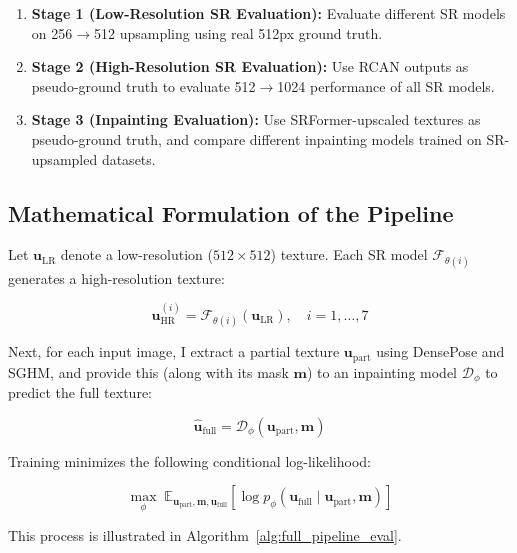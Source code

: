 \begin{enumerate}
    \item \textbf{Stage 1 (Low-Resolution SR Evaluation):} Evaluate different SR models on 256$\rightarrow$512 upsampling using real 512px ground truth.
    \item \textbf{Stage 2 (High-Resolution SR Evaluation):} Use RCAN outputs as pseudo-ground truth to evaluate 512$\rightarrow$1024 performance of all SR models.
    \item \textbf{Stage 3 (Inpainting Evaluation):} Use SRFormer-upscaled textures as pseudo-ground truth, and compare different inpainting models trained on SR-upsampled datasets.
\end{enumerate}

\subsection{Mathematical Formulation of the Pipeline}

Let $\mathbf{u}_{\text{LR}}$ denote a low-resolution ($512\times512$) texture. Each SR model $\mathcal{F}_{\theta(i)}$ generates a high-resolution texture:

\begin{equation}
\mathbf{u}^{(i)}_{\text{HR}} = \mathcal{F}_{\theta(i)}(\mathbf{u}_{\text{LR}}), \quad i = 1, \dots, 7
\end{equation}

Next, for each input image, I extract a partial texture $\mathbf{u}_{\text{part}}$ using DensePose and SGHM, and provide this (along with its mask $\mathbf{m}$) to an inpainting model $\mathcal{D}_\phi$ to predict the full texture:

\begin{equation}
\hat{\mathbf{u}}_{\text{full}} = \mathcal{D}_\phi(\mathbf{u}_{\text{part}}, \mathbf{m})
\end{equation}

Training minimizes the following conditional log-likelihood:

\begin{equation}
\max_{\phi} \; \mathbb{E}_{\mathbf{u}_{\text{part}}, \mathbf{m}, \mathbf{u}_{\text{full}}} 
\left[ \log p_\phi\left( \mathbf{u}_{\text{full}} \mid \mathbf{u}_{\text{part}}, \mathbf{m} \right) \right]
\end{equation}


This process is illustrated in Algorithm~\ref{alg:full_pipeline_eval}.

